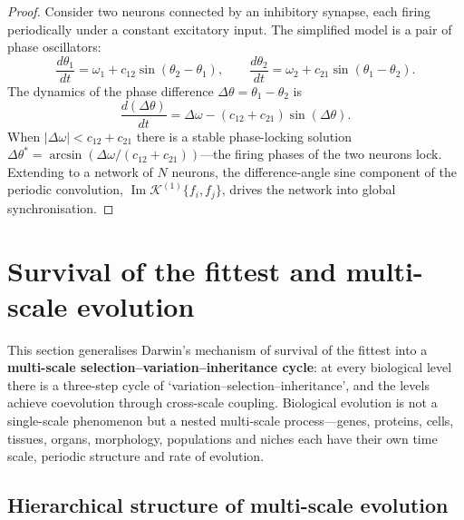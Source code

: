 \begin{proof}
Consider two neurons connected by an inhibitory synapse, each firing periodically under a constant excitatory input. The simplified model is a pair of phase oscillators:
\[
\frac{d\theta_1}{dt} = \omega_1 + c_{12} \sin(\theta_2 - \theta_1), \qquad \frac{d\theta_2}{dt} = \omega_2 + c_{21} \sin(\theta_1 - \theta_2).
\]
The dynamics of the phase difference $\Delta\theta = \theta_1 - \theta_2$ is
\[
\frac{d(\Delta\theta)}{dt} = \Delta\omega - (c_{12} + c_{21})\sin(\Delta\theta).
\]
When $|\Delta\omega| < c_{12} + c_{21}$ there is a stable phase-locking solution $\Delta\theta^* = \arcsin(\Delta\omega/(c_{12} + c_{21}))$---the firing phases of the two neurons lock. Extending to a network of $N$ neurons, the difference-angle sine component of the periodic convolution, $\operatorname{Im}\mathcal{K}^{(1)}\{f_i, f_j\}$, drives the network into global synchronisation.
\end{proof}

\section{Survival of the fittest and multi-scale evolution}

This section generalises Darwin's mechanism of survival of the fittest into a \textbf{multi-scale selection--variation--inheritance cycle}: at every biological level there is a three-step cycle of `variation--selection--inheritance', and the levels achieve coevolution through cross-scale coupling. Biological evolution is not a single-scale phenomenon but a nested multi-scale process---genes, proteins, cells, tissues, organs, morphology, populations and niches each have their own time scale, periodic structure and rate of evolution.

\subsection{Hierarchical structure of multi-scale evolution}

